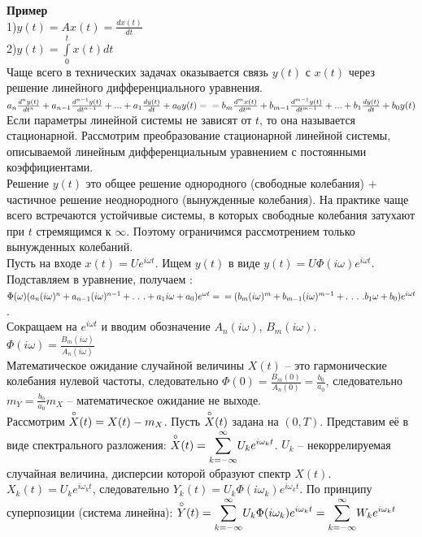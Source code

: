 \documentclass[russian, 12pt, fleqn,x11names]{article}
\begin{document}
\noindent
\textbf{Пример} \\
1)$y(t)=Ax(t) = \frac{dx(t)}{dt}$\\
2)$y(t) = \displaystyle{\int \limits_{0}^{t} } x(t)dt$\\
Чаще всего в технических задачах оказывается связь $y(t)$ с $x(t)$ через решение линейного дифференциального уравнения.\\
$a_n\frac{d^ny(t)}{dt^n} + a_{n - 1} \frac{d^{n - 1}y(t)}{dt^{n - 1}} + . . . +  a_1\frac{dy(t)}{dt} + a_0y(t) = \\ = b_m\frac{d^mx(t)}{dt^m} + b_{m - 1} \frac{d^{m - 1}y(t)}{dt^{m - 1}} + . . . +  b_1\frac{dy(t)}{dt} + b_0y(t)  $\\
Если параметры линейной системы не зависят от $t$, то она называется стационарной. Рассмотрим преобразование стационарной линейной системы, описываемой линейным дифференциальным уравнением с постоянными коэффициентами.\\
Решение $y(t)$  это  общее решение однородного (свободные колебания) + частичное решение неоднородного (вынужденные колебания). На практике чаще всего встречаются устойчивые системы, в которых свободные колебания затухают при $t$ стремящимся к $\infty$. Поэтому ограничимся рассмотрением только вынужденных колебаний.\\
Пусть на входе $x(t) = Ue^{i \omega t}$. Ищем $y(t)$ в виде $y(t) = U \Phi(i\omega) e^{i\omega t}$. Подставляем в уравнение, получаем : 
$\Phi(\omega) (a_n (i\omega)^n + a_{n-1} (i\omega)^{n-1} + .\ .\ . + a_1i\omega + a_0)e^{\omega t}  = \\ = (b_m(i\omega)^m  + b_{m - 1}(i\omega)^{m-1}  + .\ .\ .\ . b_1\omega + b_0) e^{i\omega t}$.\\
Сокращаем на $e^{i\omega t}$ и вводим обозначение $A_n(i\omega)$, $B_m(i\omega)$.\\
$\Phi(i\omega)= \frac{B_m(i\omega)}{A_n(i\omega)}$\\
Математическое ожидание случайной величины $X(t)$ -- это гармонические колебания нулевой частоты, следовательно $\Phi(0) = \frac{B_m(0)}{A_n(0)} = \frac{b_0}{a_0}$, следовательно $m_Y = \frac{b_0}{a_0}m_X$ -- математическое ожидание не выходе.\\
Рассмотрим $\displaystyle{\buildrel\circ\over X}(t) =  X(t) - m_X$. Пусть $\displaystyle{\buildrel\circ\over X}(t)$ задана на $(0, T)$. Представим её в виде спектрального разложения: $\displaystyle{\buildrel\circ\over X}(t) = \displaystyle{\sum \limits _{k  = - \infty} ^ {\infty}} U_k e^{i \omega_k t}$. $U_k$ -- некоррелируемая случайная величина, дисперсии которой образуют спектр $X(t)$. $X_k(t) = U_k e^{i\omega_k t}$, следовательно $Y_k(t) = U_k \Phi(i\omega_k) e^{i \omega_k t}$. По принципу суперпозиции (система линейна): $\displaystyle{\buildrel\circ\over Y}(t)=   \displaystyle{\sum \limits_{k = -\infty}^{\infty}} U_k \Phi(i\omega_k) e^{i\omega_k t} = \displaystyle{\sum \limits _{k  = - \infty} ^ {\infty}} W_k e^{i \omega_k t}$\\
\end{document}
